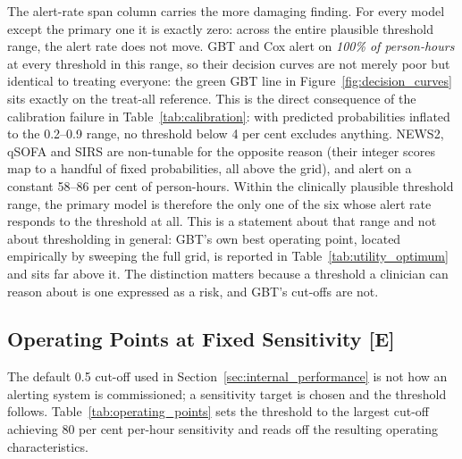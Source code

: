 The alert-rate span column carries the more damaging finding. For every model
except the primary one it is exactly zero: across the entire plausible
threshold range, the alert rate does not move. GBT and Cox alert on
\emph{100\% of person-hours} at every threshold in this range, so their
decision curves are
not merely poor but identical to treating everyone: the green GBT line in
Figure~\ref{fig:decision_curves} sits exactly on the treat-all reference.
This is the direct consequence of the calibration failure in
Table~\ref{tab:calibration}: with predicted probabilities inflated to the
0.2--0.9 range, no threshold below 4 per cent excludes anything. NEWS2, qSOFA
and SIRS are non-tunable for the opposite reason (their integer scores map
to a handful of fixed probabilities, all above the grid), and alert on a
constant 58--86 per cent of person-hours. Within the clinically plausible
threshold range, the primary model is therefore the only one of the six whose
alert rate responds to the threshold at all. This is a statement about that
range and not about thresholding in general: GBT's own best operating point,
located empirically by sweeping the full grid, is reported in
Table~\ref{tab:utility_optimum} and sits far above it. The distinction matters
because a threshold a clinician can reason about is one expressed as a risk,
and GBT's cut-offs are not.

\subsection{Operating Points at Fixed Sensitivity \texorpdfstring{[E]}{[E]}}
\label{sec:operating_points}

The default 0.5 cut-off used in Section~\ref{sec:internal_performance} is not
how an alerting system is commissioned; a sensitivity target is chosen and the
threshold follows. Table~\ref{tab:operating_points} sets the threshold to the
largest cut-off achieving 80 per cent per-hour sensitivity and reads off the
resulting operating characteristics.

